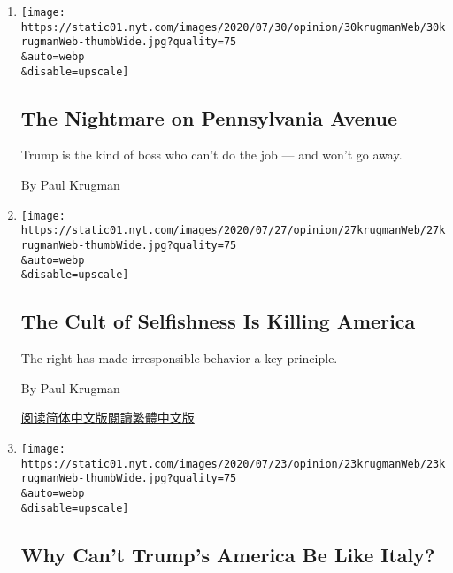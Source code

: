 \begin{enumerate}
\def\labelenumi{\arabic{enumi}.}
\item
  \href{/2020/07/30/opinion/trump-coronavirus-economy.html}{}

  \texttt{[image: https://static01.nyt.com/images/2020/07/30/opinion/30krugmanWeb/30krugmanWeb-thumbWide.jpg?quality=75\\\&auto=webp\\\&disable=upscale]}

  \hypertarget{the-nightmare-on-pennsylvania-avenue}{%
  \subsection{The Nightmare on Pennsylvania
  Avenue}\label{the-nightmare-on-pennsylvania-avenue}}

  Trump is the kind of boss who can't do the job --- and won't go away.

  By Paul Krugman
\item
  \href{/2020/07/27/opinion/us-republicans-coronavirus.html}{}

  \texttt{[image: https://static01.nyt.com/images/2020/07/27/opinion/27krugmanWeb/27krugmanWeb-thumbWide.jpg?quality=75\\\&auto=webp\\\&disable=upscale]}

  \hypertarget{the-cult-of-selfishness-is-killing-america}{%
  \subsection{The Cult of Selfishness Is Killing
  America}\label{the-cult-of-selfishness-is-killing-america}}

  The right has made irresponsible behavior a key principle.

  By Paul Krugman

  \href{https://cn.nytimes.com/opinion/20200728/us-republicans-coronavirus/}{阅读简体中文版}\href{https://cn.nytimes.com/opinion/20200728/us-republicans-coronavirus/zh-hant/}{閱讀繁體中文版}
\item
  \href{/2020/07/23/opinion/us-italy-coronavirus.html}{}

  \texttt{[image: https://static01.nyt.com/images/2020/07/23/opinion/23krugmanWeb/23krugmanWeb-thumbWide.jpg?quality=75\\\&auto=webp\\\&disable=upscale]}

  \hypertarget{why-cant-trumps-america-be-like-italy}{%
  \subsection{Why Can't Trump's America Be Like
  Italy?}\label{why-cant-trumps-america-be-like-italy}}


\end{enumerate}
